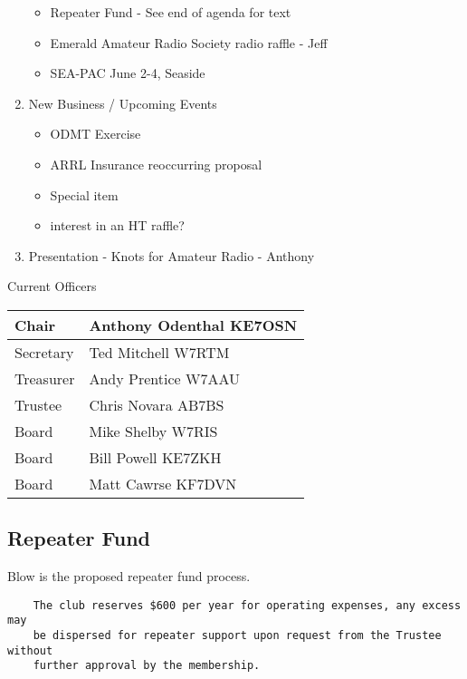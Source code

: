 \documentclass[letter,11pt]{extarticle}
\begin{document}
\begin{enumerate}
\begin{itemize}
				\item Repeater Fund - See end of agenda for text
				\item Emerald Amateur Radio Society radio raffle - Jeff
				\item SEA-PAC June 2-4, Seaside	
			\end{itemize}
		\item  New Business / Upcoming Events
			\begin{itemize}
				\item ODMT Exercise
				\item ARRL Insurance reoccurring proposal
				\item Special item
				\item interest in an HT raffle?
			\end{itemize}
		\item  Presentation - Knots for Amateur Radio - Anthony
	\end{enumerate}


	Current Officers \\
	\begin{tabular}{|l|l|} \hline
		Chair & Anthony Odenthal KE7OSN \\ \hline
		Secretary & Ted Mitchell W7RTM \\ \hline
		Treasurer & Andy Prentice W7AAU \\ \hline
		Trustee & Chris Novara AB7BS \\ \hline
		Board & Mike Shelby W7RIS \\ \hline
		Board & Bill Powell KE7ZKH \\ \hline
		Board & Matt Cawrse KF7DVN \\ \hline
	\end{tabular}
	
	\subsection*{}
	
	\subsection*{Repeater Fund}
	Blow is the proposed  repeater fund process.
	\begin{lstlisting}
	The club reserves $600 per year for operating expenses, any excess may
	be dispersed for repeater support upon request from the Trustee without
	further approval by the membership.
	\end{lstlisting}
	
\end{document}
